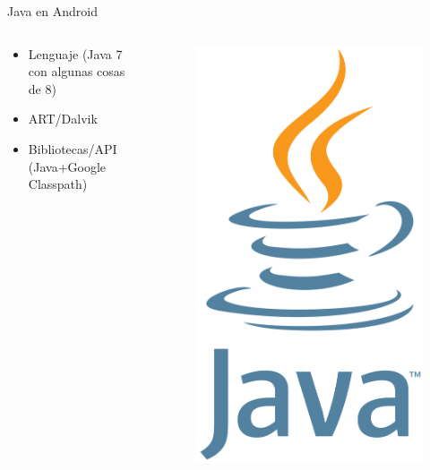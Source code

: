 \documentclass[aspectratio=169]{beamer}
\begin{document}
\begin{frame}[fragile]{Java en Android}
    
    \begin{columns}
        \begin{column}{0.5\textwidth}
            \begin{itemize}
                \item Lenguaje (Java 7 con algunas cosas de 8)
                \item ART/Dalvik
                \item Bibliotecas/API (Java+Google Classpath)
            \end{itemize}
        \end{column}
        \begin{column}{0.5\textwidth}  %
            \begin{figure}
                \centering
                \includegraphics[width=0.4\linewidth]{Images/java}
            \end{figure}
        \end{column}
    \end{columns}
    
    
\end{frame}
\end{document}

